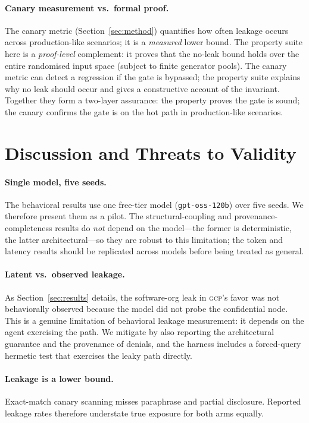 \documentclass[10pt,twocolumn,letterpaper]{article}
\newcommand{\gcp}{\textsc{gcp}}
\begin{document}
\paragraph{Canary measurement vs.\ formal proof.}
The canary metric (Section~\ref{sec:method}) quantifies how often leakage occurs across
production-like scenarios; it is a \emph{measured} lower bound. The property suite here is a
\emph{proof-level} complement: it proves that the no-leak bound holds over the entire randomised
input space (subject to finite generator pools). The canary metric can detect a regression if the
gate is bypassed; the property suite explains why no leak should occur and gives a constructive
account of the invariant. Together they form a two-layer assurance: the property proves the gate is
sound; the canary confirms the gate is on the hot path in production-like scenarios.

\section{Discussion and Threats to Validity}
\label{sec:threats}

\paragraph{Single model, five seeds.} The behavioral results use one free-tier model
(\texttt{gpt-oss-120b}) over five seeds. We therefore present them as a pilot. The structural-coupling
and provenance-completeness results do \emph{not} depend on the model---the former is deterministic,
the latter architectural---so they are robust to this limitation; the token and latency results should
be replicated across models before being treated as general.

\paragraph{Latent vs.\ observed leakage.} As Section~\ref{sec:results} details, the software-org leak in
\gcp{}'s favor was not behaviorally observed because the model did not probe the confidential node.
This is a genuine limitation of behavioral leakage measurement: it depends on the agent exercising the
path. We mitigate by also reporting the architectural guarantee and the provenance of denials, and the
harness includes a forced-query hermetic test that exercises the leaky path directly.

\paragraph{Leakage is a lower bound.} Exact-match canary scanning misses paraphrase and partial
disclosure. Reported leakage rates therefore understate true exposure for both arms equally.
\end{document}
